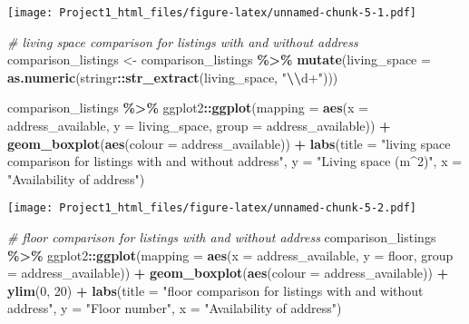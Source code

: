 \documentclass[
]{article}
\newenvironment{Shaded}{\begin{snugshade}}{\end{snugshade}}
\newcommand{\AttributeTok}[1]{\textcolor[rgb]{0.13,0.29,0.53}{#1}}
\newcommand{\CommentTok}[1]{\textcolor[rgb]{0.56,0.35,0.01}{\textit{#1}}}
\newcommand{\DecValTok}[1]{\textcolor[rgb]{0.00,0.00,0.81}{#1}}
\newcommand{\FunctionTok}[1]{\textcolor[rgb]{0.13,0.29,0.53}{\textbf{#1}}}
\newcommand{\NormalTok}[1]{#1}
\newcommand{\OtherTok}[1]{\textcolor[rgb]{0.56,0.35,0.01}{#1}}
\newcommand{\SpecialCharTok}[1]{\textcolor[rgb]{0.81,0.36,0.00}{\textbf{#1}}}
\newcommand{\StringTok}[1]{\textcolor[rgb]{0.31,0.60,0.02}{#1}}
\begin{document}
\texttt{[image: Project1\_html\_files/figure-latex/unnamed-chunk-5-1.pdf]}

\begin{Shaded}
\begin{Highlighting}[]
\CommentTok{\# living space comparison for listings with and without address}
\NormalTok{comparison\_listings }\OtherTok{\textless{}{-}}\NormalTok{ comparison\_listings }\SpecialCharTok{\%\textgreater{}\%}
  \FunctionTok{mutate}\NormalTok{(}\AttributeTok{living\_space =} \FunctionTok{as.numeric}\NormalTok{(stringr}\SpecialCharTok{::}\FunctionTok{str\_extract}\NormalTok{(living\_space, }\StringTok{"}\SpecialCharTok{\textbackslash{}\textbackslash{}}\StringTok{d+"}\NormalTok{)))}


\NormalTok{comparison\_listings }\SpecialCharTok{\%\textgreater{}\%}
\NormalTok{  ggplot2}\SpecialCharTok{::}\FunctionTok{ggplot}\NormalTok{(}\AttributeTok{mapping =} \FunctionTok{aes}\NormalTok{(}\AttributeTok{x =}\NormalTok{ address\_available, }\AttributeTok{y =}\NormalTok{ living\_space, }\AttributeTok{group =}
\NormalTok{                                  address\_available)) }\SpecialCharTok{+}
  \FunctionTok{geom\_boxplot}\NormalTok{(}\FunctionTok{aes}\NormalTok{(}\AttributeTok{colour =}\NormalTok{ address\_available)) }\SpecialCharTok{+}
  \FunctionTok{labs}\NormalTok{(}\AttributeTok{title =} \StringTok{"living space comparison for listings with and without address"}\NormalTok{,}
       \AttributeTok{y =} \StringTok{"Living space (m\^{}2)"}\NormalTok{,}
       \AttributeTok{x =} \StringTok{"Availability of address"}\NormalTok{)}
\end{Highlighting}
\end{Shaded}

\texttt{[image: Project1\_html\_files/figure-latex/unnamed-chunk-5-2.pdf]}

\begin{Shaded}
\begin{Highlighting}[]
\CommentTok{\# floor comparison for listings with and without address}
\NormalTok{comparison\_listings }\SpecialCharTok{\%\textgreater{}\%}
\NormalTok{  ggplot2}\SpecialCharTok{::}\FunctionTok{ggplot}\NormalTok{(}\AttributeTok{mapping =} \FunctionTok{aes}\NormalTok{(}\AttributeTok{x =}\NormalTok{ address\_available, }\AttributeTok{y =}\NormalTok{ floor, }\AttributeTok{group =}
\NormalTok{                                  address\_available)) }\SpecialCharTok{+}
  \FunctionTok{geom\_boxplot}\NormalTok{(}\FunctionTok{aes}\NormalTok{(}\AttributeTok{colour =}\NormalTok{ address\_available)) }\SpecialCharTok{+} \FunctionTok{ylim}\NormalTok{(}\DecValTok{0}\NormalTok{, }\DecValTok{20}\NormalTok{) }\SpecialCharTok{+}
  \FunctionTok{labs}\NormalTok{(}\AttributeTok{title =} \StringTok{"floor comparison for listings with and without address"}\NormalTok{,}
       \AttributeTok{y =} \StringTok{"Floor number"}\NormalTok{,}
       \AttributeTok{x =} \StringTok{"Availability of address"}\NormalTok{)}
\end{Highlighting}
\end{Shaded}
\end{document}
